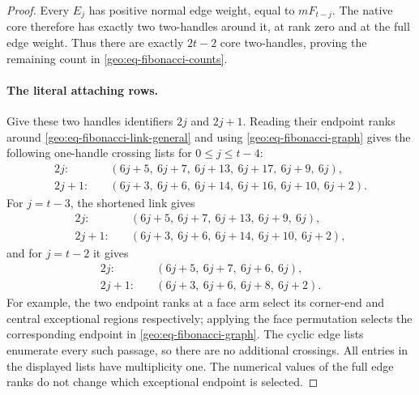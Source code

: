 \begin{proof}
Every $E_j$ has positive normal edge weight, equal to $mF_{t-j}$.  The
native core therefore has exactly two two-handles around it, at rank zero
and at the full edge weight.  Thus there are exactly $2t-2$ core
two-handles, proving the remaining count in
\eqref{geo:eq-fibonacci-counts}.

\paragraph{The literal attaching rows.}
Give these two handles identifiers $2j$ and $2j+1$.  Reading their endpoint
ranks around \eqref{geo:eq-fibonacci-link-general} and using
\eqref{geo:eq-fibonacci-graph} gives the following one-handle crossing
lists for $0\le j\le t-4$:
\[
\begin{split}
 2j:\quad &(6j+5,\ 6j+7,\ 6j+13,\ 6j+17,\ 6j+9,\ 6j),\\
 2j+1:\quad &(6j+3,\ 6j+6,\ 6j+14,\ 6j+16,\ 6j+10,\ 6j+2).
\end{split}
 \tag{G19}\label{geo:eq-fibonacci-full-general}
\]
For $j=t-3$, the shortened link gives
\[
\begin{split}
 2j:\quad &(6j+5,\ 6j+7,\ 6j+13,\ 6j+9,\ 6j),\\
 2j+1:\quad &(6j+3,\ 6j+6,\ 6j+14,\ 6j+10,\ 6j+2),
\end{split}
 \tag{G20}\label{geo:eq-fibonacci-full-penultimate}
\]
and for $j=t-2$ it gives
\[
\begin{split}
 2j:\quad &(6j+5,\ 6j+7,\ 6j+6,\ 6j),\\
 2j+1:\quad &(6j+3,\ 6j+6,\ 6j+8,\ 6j+2).
\end{split}
 \tag{G21}\label{geo:eq-fibonacci-full-last}
\]
For example, the two endpoint ranks at a face arm select its corner-end
and central exceptional regions respectively; applying the face
permutation selects the corresponding endpoint in
\eqref{geo:eq-fibonacci-graph}.  The cyclic edge lists enumerate every
such passage, so there are no additional crossings.  All entries in the
displayed lists have multiplicity one.  The numerical values of the full
edge ranks do not change which exceptional endpoint is selected.


\end{proof}
